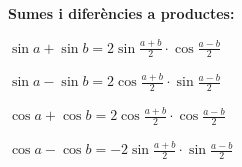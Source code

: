\begin{bluebox}
 
 
 
 
 \textbf{Sumes i diferències a  productes:}
 
 \quad [17]\; $  \sin a+\sin b=2\sin \frac{a+b}{2} \cdot \cos \frac{a-b}{2} $ 
 
 \quad [18]\; $  \sin a-\sin b=2\cos \frac{a+b}{2} \cdot \sin \frac{a-b}{2} $ 
 
 \quad [19]\; $  \cos a+\cos b=2\cos \frac{a+b}{2} \cdot \cos \frac{a-b}{2} $ 
 
\quad [20]\; $  \cos a-\cos b=-2\sin \frac{a+b}{2} \cdot \sin \frac{a-b}{2} $ 
 \end{bluebox}
 
 
  